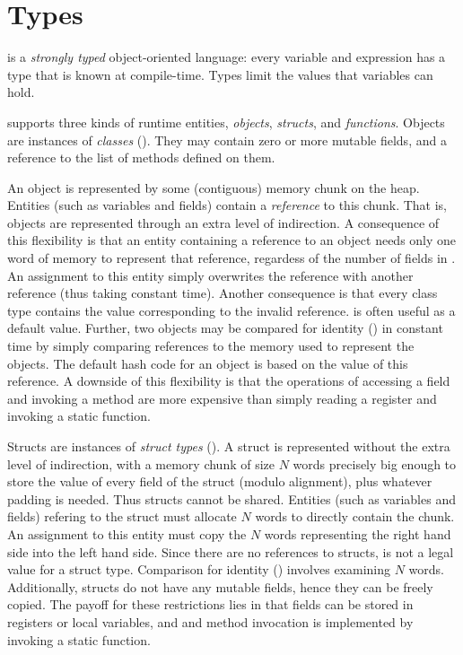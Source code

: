 \chapter{Types}
\label{XtenTypes}

{}\Xten{} is a {\em strongly typed} object-oriented language: every
variable and expression has a type that is known at compile-time.
Types limit the values that variables can hold.

{}\Xten{} supports three kinds of runtime entities, {\em objects},
{\em structs}, and {\em functions}. Objects are instances of {\em
  classes} (). They may contain zero or
more mutable fields, and a reference to the list of methods defined on them.

An object is represented by some (contiguous) memory chunk on the
heap. Entities (such as variables and fields) contain a {\em
  reference} to this chunk. That is, objects are represented through
an extra level of indirection.  A consequence of this flexibility is
that an entity containing a reference to an object  needs only
one word of memory to represent that reference, regardess of the
number of fields in . An assignment to this entity simply
overwrites the reference with another reference (thus taking constant
time). Another consequence is that every class type contains the value
 corresponding to the invalid reference.  is often
useful as a default value. Further, two objects may be compared for
identity (\Xcd{==}) in constant time by simply comparing references to
the memory used to represent the objects. The default hash code for an
object is based on the value of this reference. A downside of this
flexibility is that the operations of accessing a field and invoking a
method are more expensive than simply reading a register and
invoking a static function.


Structs are instances of {\em struct types} ().  A
struct is represented without the extra level of indirection, with a
memory chunk of size $N$ words precisely big enough to store the value
of every field of the struct (modulo alignment), plus whatever padding is needed. Thus structs cannot
be shared. Entities (such as variables and fields) refering to the
struct must allocate $N$ words to directly contain the chunk.  An
assignment to this entity must copy the $N$ words representing the
right hand side into the left hand side. Since there are no references
to structs,  is not a legal value for a struct
type. Comparison for identity (\Xcd{==}) involves examining $N$
words. Additionally, structs do not have any mutable fields, hence
they can be freely copied. The payoff for these restrictions lies in
that fields can be stored in registers or local variables, and 
and method invocation is implemented by invoking a static function.

